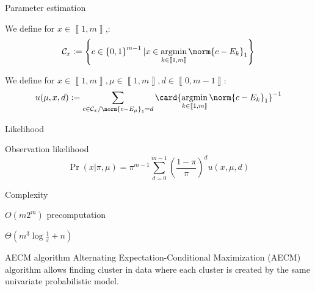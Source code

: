\documentclass{beamer}
\renewcommand{\epsilon}{\varepsilon}
\DeclareMathOperator*{\argmin}{argmin}
\newcommand{\bbrack}[1]{\left\llbracket#1\right\rrbracket}
\newcommand{\set}[1]{\ensuremath{\left\{ #1 \right\}}}
\begin{document}
\begin{frame}{Parameter estimation}
    \begin{definition}
    We define for $x \in \bbrack{1, m}$,:
\[ \mathcal{C}_x := \set{c \in \set{0, 1}^{m-1} | x \in \argmin_{k \in \bbrack{1, m}} \norm{c - E_k}_1 }\]
\end{definition}

\begin{definition}
    We define for $x \in \bbrack{1, m}, \mu \in \bbrack{1, m}, d \in \bbrack{0, m-1}$:
    \[ u(\mu, x, d) := \sum_{c \in \mathcal{C}_x / \norm{c - E_{\mu}}_1 = d}  \card{\argmin_{k \in \bbrack{1, m}} \norm{c - E_k}_1}^{-1}\]
\end{definition}

\end{frame}

\begin{frame}{Likelihood}
    \begin{theorem}{Observation likelihood}
    \label{thm:p_x_knowing_pi_mu}
    \[\Pr(x | \pi, \mu) = \pi^{m-1} \sum_{d = 0}^{m-1} \left(\frac{1 - \pi}{\pi}\right)^d u(x, \mu, d)\]
\end{theorem}


\begin{block}{Complexity }
    
    $O(m2^m)$ precomputation
    
    $\Theta(m^3 \log \frac{1}{\epsilon} + n)$
\end{block}

\end{frame}
\begin{frame}{AECM algorithm}
    Alternating Expectation-Conditional Maximization (AECM) algorithm allows finding cluster in data where each cluster is created by the same univariate probabilistic model.

\end{frame}
\end{document}
